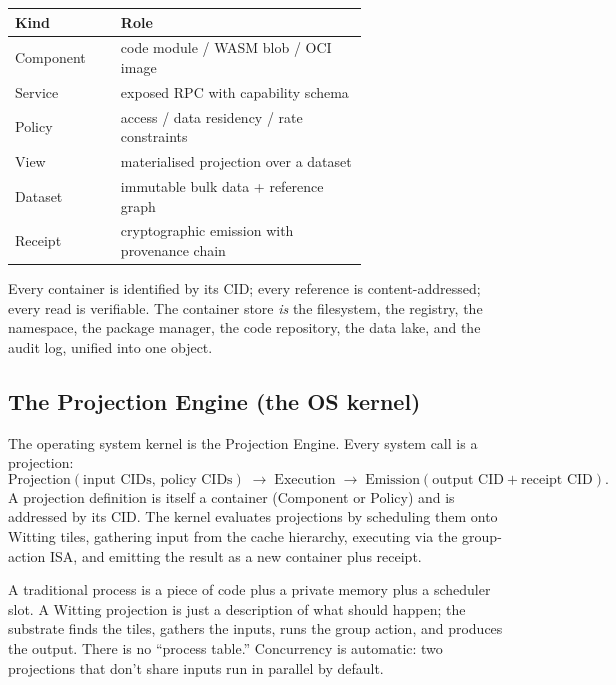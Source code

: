 \documentclass[11pt,letterpaper]{article}
\theoremstyle{remark}
\begin{document}
\begin{center}
\renewcommand{\arraystretch}{1.15}
\begin{tabular}{lp{0.7\linewidth}}
\toprule
\textbf{Kind} & \textbf{Role} \\
\midrule
Component & code module / WASM blob / OCI image \\
Service   & exposed RPC with capability schema \\
Policy    & access / data residency / rate constraints \\
View      & materialised projection over a dataset \\
Dataset   & immutable bulk data + reference graph \\
Receipt   & cryptographic emission with provenance chain \\
\bottomrule
\end{tabular}
\end{center}

Every container is identified by its CID; every reference is content-addressed; every
read is verifiable. The container store \emph{is} the filesystem, the registry, the
namespace, the package manager, the code repository, the data lake, and the audit log,
unified into one object.

\subsection{The Projection Engine (the OS kernel)}

The operating system kernel is the Projection Engine. Every system call is a projection:
\[
\text{Projection}(\text{input CIDs},\, \text{policy CIDs})
\;\to\;
\text{Execution}
\;\to\;
\text{Emission}(\text{output CID} + \text{receipt CID}).
\]
A projection definition is itself a container (Component or Policy) and is addressed by
its CID. The kernel evaluates projections by scheduling them onto Witting tiles, gathering
input from the cache hierarchy, executing via the group-action ISA, and emitting the
result as a new container plus receipt.

\begin{intuition}
A traditional process is a piece of code plus a private memory plus a scheduler slot. A
Witting projection is just a description of what should happen; the substrate finds the
tiles, gathers the inputs, runs the group action, and produces the output. There is no
``process table.'' Concurrency is automatic: two projections that don't share inputs
run in parallel by default.
\end{intuition}
\end{document}
